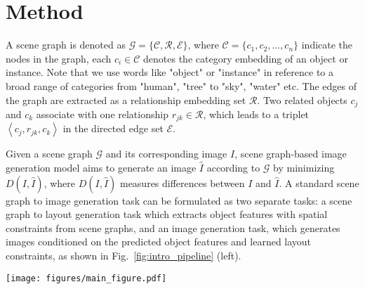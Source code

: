 \section{Method}
A scene graph is denoted as $\mathcal{G}=\{ \mathcal{C}, \mathcal{R}, \mathcal{E} \}$, where $\mathcal{C}=\{c_1, c_2, ..., c_n\}$ indicate the nodes in the graph, each $c_i\in \mathcal{C}$ denotes the category embedding of an object or instance. Note that we use words like "object" or "instance" in reference to a broad range of categories from "human", "tree" to "sky", "water" etc. The edges of the graph are extracted as a relationship embedding set $\mathcal{R}$. Two related objects $c_j$ and $c_k$ associate with one relationship $r_{jk}\in \mathcal{R}$, which leads to a triplet $\left \langle c_j, r_{jk}, c_k \right \rangle$ in the directed edge set $\mathcal{E}$.

Given a scene graph $\mathcal{G}$ and its corresponding image $I$, scene graph-based image generation model aims to generate an image $\widehat{I}$ according to $\mathcal{G}$ by minimizing $D(I, \widehat{I})$, where $D(I, \widehat{I})$ measures differences between $I$ and $\widehat{I}$. A standard scene graph to image generation task can be formulated as two separate tasks: a scene graph to layout generation task which extracts object features with spatial constraints from scene graphs, and an image generation task, which generates images conditioned on the predicted object features and learned layout constraints, as shown in Fig.~\ref{fig:intro_pipeline} (left).

\begin{figure*}[!ht]
\centering
\texttt{[image: figures/main\_figure.pdf]}
\caption{Illustrations of standard (left) and our (right) framework for scene graph to image generation. Left: Directly generating layout and image based on object features extracted from scene graph. Right: Our proposed framework with object pair-wise spatial constraints and appearance supervision respecting relationships among objects.}
\label{fig:intro_pipeline}
\end{figure*}

